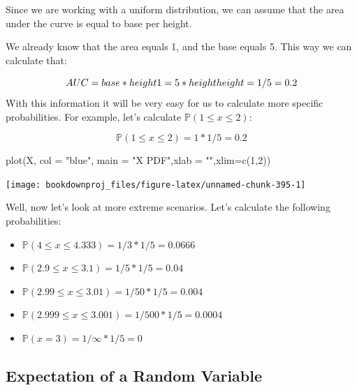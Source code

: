 \documentclass[
]{book}
\newenvironment{Shaded}{\begin{snugshade}}{\end{snugshade}}
\newcommand{\AttributeTok}[1]{\textcolor[rgb]{0.77,0.63,0.00}{#1}}
\newcommand{\DecValTok}[1]{\textcolor[rgb]{0.00,0.00,0.81}{#1}}
\newcommand{\FunctionTok}[1]{\textcolor[rgb]{0.00,0.00,0.00}{#1}}
\newcommand{\NormalTok}[1]{#1}
\newcommand{\StringTok}[1]{\textcolor[rgb]{0.31,0.60,0.02}{#1}}
\providecommand{\tightlist}{%
  \setlength{\itemsep}{0pt}\setlength{\parskip}{0pt}}
\theoremstyle{definition}
\theoremstyle{definition}
\theoremstyle{definition}
\theoremstyle{definition}
\theoremstyle{remark}
\begin{document}
Since we are working with a uniform distribution, we can assume that the area under the curve is equal to base per height.

We already know that the area equals 1, and the base equals 5. This way we can calculate that:

\[
AUC = base*height \\
1 = 5*height \\
height = 1/5 = 0.2
\]
With this information it will be very easy for us to calculate more specific probabilities. For example, let's calculate \(\mathbb{P}(1 \leq x \leq 2)\):

\[
\mathbb{P}(1 \leq x \leq 2) = 1*1/5 = 0.2
\]

\begin{Shaded}
\begin{Highlighting}[]
\FunctionTok{plot}\NormalTok{(X, }\AttributeTok{col =} \StringTok{"blue"}\NormalTok{, }\AttributeTok{main =} \StringTok{"X PDF"}\NormalTok{,}\AttributeTok{xlab =} \StringTok{""}\NormalTok{,}\AttributeTok{xlim=}\FunctionTok{c}\NormalTok{(}\DecValTok{1}\NormalTok{,}\DecValTok{2}\NormalTok{))}
\end{Highlighting}
\end{Shaded}

\begin{center}\texttt{[image: bookdownproj\_files/figure-latex/unnamed-chunk-395-1]} \end{center}

Well, now let's look at more extreme scenarios. Let's calculate the following probabilities:

\begin{itemize}
\tightlist
\item
  \(\mathbb{P}(4 \leq x \leq 4.333) = 1/3 * 1/5 = 0.0666\)
\item
  \(\mathbb{P}(2.9 \leq x \leq 3.1) = 1/5 * 1/5 = 0.04\)
\item
  \(\mathbb{P}(2.99 \leq x \leq 3.01) = 1/50 * 1/5 = 0.004\)
\item
  \(\mathbb{P}(2.999 \leq x \leq 3.001) = 1/500 * 1/5 = 0.0004\)
\item
  \(\mathbb{P}(x=3) = 1/\infty * 1/5 = 0\)
\end{itemize}

\hypertarget{expectation-of-a-random-variable}{%
\subsection{Expectation of a Random Variable}\label{expectation-of-a-random-variable}}
\end{document}
